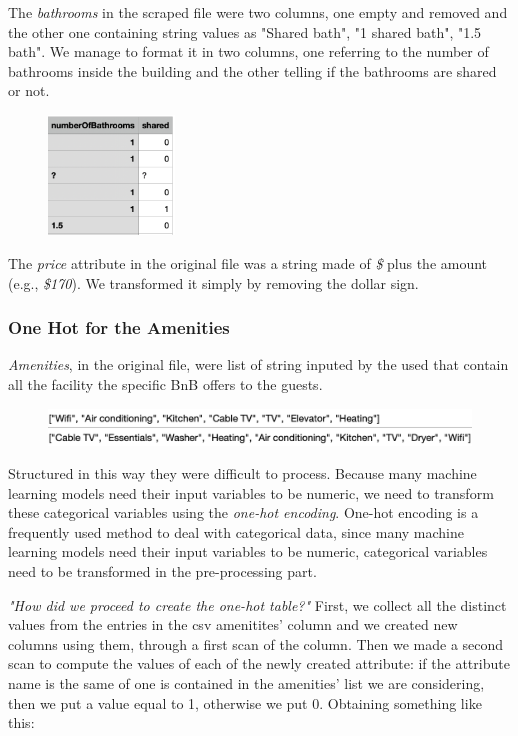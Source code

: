 The \textit{bathrooms} in the scraped file were two columns, one empty and removed and the other one containing string values as "Shared bath", "1 shared bath", "1.5 bath". We manage to format it in two columns, one referring to the number of bathrooms inside the building and the other telling if the bathrooms are shared or not.
\begin{figure}[H]
	\centering
	\includegraphics[width=0.3\textwidth]{img/bath.png}  
\end{figure}

The \textit{price} attribute in the original file was a string made of \textit{\$} plus the amount (e.g., \textit{\$170}). We transformed it simply by removing the dollar sign.

\subsubsection{One Hot for the Amenities}
\textit{Amenities}, in the original file, were list of string inputed by the used that contain all the facility the specific BnB offers to the guests.
\begin{figure}[H]
	\centering
	\includegraphics[width=\textwidth]{img/amenities.png}  
\end{figure}

Structured in this way they were difficult to process. Because many machine learning models need their input variables to be numeric, we need to transform these categorical variables using the \textit{one-hot encoding}. One-hot encoding is a frequently used method to deal with categorical data, since many machine learning models need their input variables to be numeric, categorical variables need to be transformed in the pre-processing part.

\textit{"How did we proceed to create the one-hot table?"} First, we collect all the distinct values from the entries in the csv amenitites' column and we created new columns using them, through a first scan of the column. Then we made a second scan to compute the values of each of the newly created attribute: if the attribute name is the same of one is contained in the amenities' list we are considering, then we put a value equal to 1, otherwise we put 0. Obtaining something like this:

